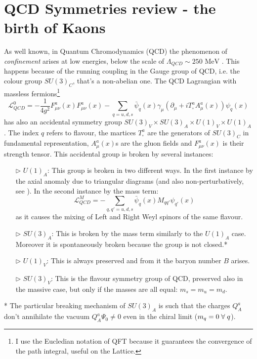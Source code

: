 \documentclass[english, LaM, oneside, noexaminfo]{sapthesis}
\newcommand{\mev}{\text{ MeV}}
\newcommand{\spc}{\hspace*{1mm}}
\begin{document}
\section{QCD Symmetries review - the birth of Kaons}
\noindent
As well known, in Quantum Chromodynamics (QCD) the phenomenon of \textit{confinement} arises at low energies, below the scale of $\Lambda_{QCD} \sim 250 \mev$ \cite{WeinbergII}.
This happens because of the running coupling in the Gauge group of QCD, i.e. the colour group $SU(3)_C$, that's a non-abelian one.
The QCD Lagrangian with massless fermions\footnote{I use the Eucledian notation of QFT because it guarantees the convergence of the path integral, useful on the Lattice.}
\begin{equation}\label{eq:masslessQCD}
    \mathcal{L}_{QCD}^0 = -\frac{1}{4g^2} F_{\mu\nu}^a(x)F_{\mu\nu}^a(x) - \sum_{q = u,d,s} \bar\psi_q (x) \gamma_\mu \left( \partial_\mu + i T^a_{\square} A_\mu^a (x) \right) \psi_q (x)
\end{equation}
has also an accidental symmetry group $SU(3)_V \times SU(3)_A \times U(1)_V \times U(1)_A$.
The index $q$ refers to flavour, the martices $T^a_{\square}$ are the generators of $SU(3)_C$ in fundamental representation, $A_\mu^a (x) $s are the gluon fields and $F_{\mu\nu}^a(x)$ is their strength tensor.
This accidental group is broken by several instances:
\begin{itemize}
    \item [$\triangleright$] $U(1)_A$: This group is broken in two different ways. In the first instance by the axial anomaly due to triangular diagrams (and also non-perturbatively, see \cite{FujikawaI}\cite{FujikawaII}).
            In the second instance by the mass term: $$\mathcal{L}_{QCD}^M = - \sum_{q,q' = u,d,s} \bar\psi_q (x) M_{qq'} \psi_{q'} (x)$$ as it causes the mixing of Left and Right Weyl spinors of the same flavour.
    \item [$\triangleright$] $SU(3)_A$: This is broken by the mass term similarly to the $U(1)_A$ case.
            Moreover it is spontaneously broken because the group is not closed.*
    \item [$\triangleright$] $U(1)_V$: This is always preserved and from it the baryon number $B$ arises.
    \item [$\triangleright$] $SU(3)_V$: This is the flavour symmetry group of QCD, preserved also in the massive case, but only if the masses are all equal: $m_s = m_u = m_d$.
\end{itemize}
* The particular breaking mechanism of $SU(3)_A$ is such that the charges $Q^a_A$ don't annihilate the vacuum $Q^a_A \Psi_0 \ne 0$ even in the chiral limit ($m_q = 0 \spc \forall \spc q$).
\end{document}
